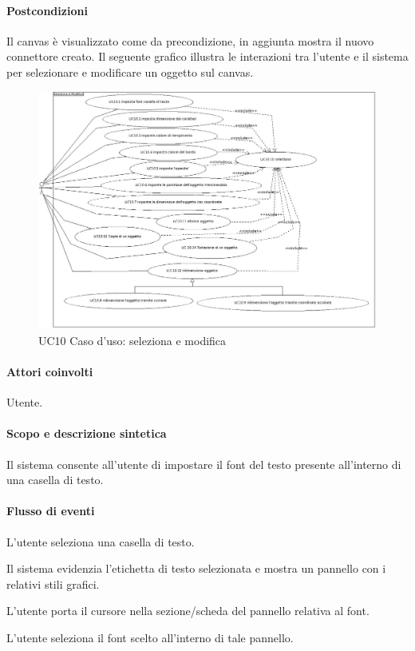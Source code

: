 \paragraph{Postcondizioni} Il canvas \`e visualizzato come da precondizione, in aggiunta mostra il nuovo connettore creato.
\newpage
{}
\label{ucselezionaemodifica}
Il seguente grafico illustra le interazioni tra l'utente e il sistema per selezionare e modificare un oggetto sul canvas.

\begin{figure}[!ht]
\centering
\vspace{20pt} 
\includegraphics{UC10Espanso.jpg}
\caption{UC10 Caso d'uso: seleziona e modifica}
\label{uc10}
\end{figure}
\newpage
{}
\paragraph{Attori coinvolti} Utente.
\paragraph{Scopo e descrizione sintetica} 
Il sistema consente all'utente di impostare il font del testo presente all'interno di una casella di testo.
\paragraph{Flusso di eventi}
\begin{elenconumerato}[\textbf{}]{\subsubsecindent}
\item L'utente seleziona una casella di testo.
\item Il sistema evidenzia l'etichetta di testo selezionata e mostra un pannello con i relativi stili grafici.
\item L'utente porta il cursore nella sezione/scheda del pannello relativa al font.
\item L'utente seleziona il font scelto all'interno di tale pannello.
\end{elenconumerato}
